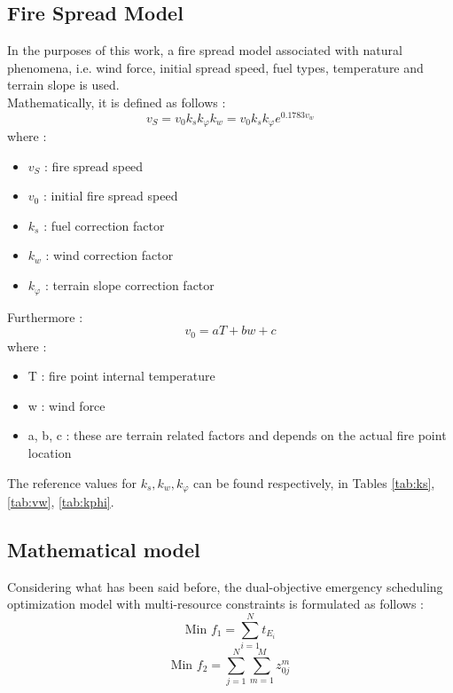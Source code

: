 \subsection{Fire Spread Model}
In the purposes of this work, a fire spread model associated with natural phenomena, i.e. wind force, initial spread speed, fuel types, temperature and terrain slope is used.\\
Mathematically, it is defined as follows :
\begin{equation}
    v_S = v_0k_sk_{\varphi} k_w = v_0 k_s k_{\varphi} e^{0.1783v_w}
    \label{eq:spread_speed}
\end{equation}
where :
\begin{itemize}
    \item $v_S$ : fire spread speed
    \item $v_0$ : initial fire spread speed
    \item $k_s$ : fuel correction factor
    \item $k_w$ : wind correction factor 
    \item $k_{\varphi}$ : terrain slope correction factor 
\end{itemize}
Furthermore : 
\begin{equation}
    v_0 = aT + bw + c
    \label{eq:intial_speed}
\end{equation}
where :
\begin{itemize}
    \item T : fire point internal temperature
    \item w : wind force
    \item a, b, c : these are terrain related factors and depends on the actual fire point location
\end{itemize}
The reference values for $k_s, k_w, k_{\varphi}$ can be found respectively, in Tables \ref{tab:ks}, \ref{tab:vw}, \ref{tab:kphi}.

\subsection{Mathematical model}
Considering what has been said before, the dual-objective emergency scheduling optimization model with multi-resource constraints is formulated as follows :
\begin{equation}
    \label{eqn:f1}
    \text{Min   } f_1 = \sum_{i=1}^N t_{E_i}
\end{equation}
\begin{equation}
    \label{eqn:f2}
    \text{Min   } f_2= \sum_{j=1}^N \sum_{m=1}^M z_{0j}^m
\end{equation}

